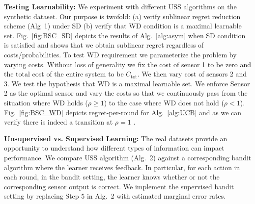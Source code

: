 \noindent
{\bf Testing Learnability:}
We experiment with different USS algorithms on the synthetic dataset. Our purpose is twofold: (a) verify sublinear regret reduction scheme (Alg~1) under SD (b) verify that WD condition is a maximal learnable set. 
Fig.~\ref{fig:BSC_SD} depicts the results of Alg.~\ref{alg:asym} when SD condition is satisfied and shows that we obtain sublinear regret regardless of costs/probabilities. To test WD requirement we parameterize the problem by varying costs. Without loss of generality we fix the cost of sensor 1 to be zero and the total cost of the entire system to be $C_{\mbox{tot}}$. We then vary cost of sensors 2 and 3. %
We test the hypothesis that WD is a maximal learnable set. We enforce Sensor 2 as the optimal sensor and vary the costs so that we continuously pass from the situation where WD holds ($\rho \geq 1$) to the case where WD does not hold ($\rho < 1$). %
Fig.~\ref{fig:BSC_WD} depicts regret-per-round for Alg.~\ref{alg:UCB} and as we can verify there is indeed a transition at $\rho = 1$ . %

\noindent
{\bf Unsupervised vs. Supervised Learning:}
The real datasets provide an opportunity to understand how different types of information can impact performance. We compare USS algorithm (Alg.~2) against a corresponding bandit algorithm where the learner receives feedback. In particular, for each action in each round, in the bandit setting, the learner knows whether or not the corresponding sensor output is correct. We implement the supervised bandit setting by replacing Step 5 in Alg.~2 with estimated marginal error rates. 

